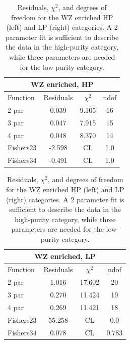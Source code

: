 \begin{table}[h!]
\centering
\begin{tabular}{|l c c c |}
\hline
\multicolumn{4}{|c|}{WZ enriched, HP}\\
\hline
Function & Residuals & $\chi^2$ & ndof \\
\hline
2 par & 0.039 & 9.105 & 16 \\
3 par & 0.047 & 7.915 & 15 \\
4 par & 0.048 & 8.370 & 14 \\
\hline
\hline
Fishers23 & -2.598& CL & 1.0\\
Fishers34 & -0.491& CL & 1.0\\
\hline
\end{tabular}
\quad
\begin{tabular}{|l c c c |}
\hline
\multicolumn{4}{|c|}{WZ enriched, LP}\\
\hline
Function & Residuals & $\chi^2$ & ndof \\
\hline
2 par & 1.016 & 17.602 & 20 \\
3 par & 0.270 & 11.424 & 19 \\
4 par & 0.269 & 11.421 & 18 \\
\hline
\hline
Fishers23 & 55.258& CL & 0.0\\
Fishers34 & 0.078& CL & 0.783\\
\hline
\end{tabular}
\caption{Residuals, $\chi^{2}$, and degrees of freedom for the WZ enriched HP (left) and LP (right) categories. A 2 parameter fit is sufficient to describe the data in the high-purity category, while three parameters are needed for the low-purity category.}
\label{tab:WZ_enriched}
\end{table}



